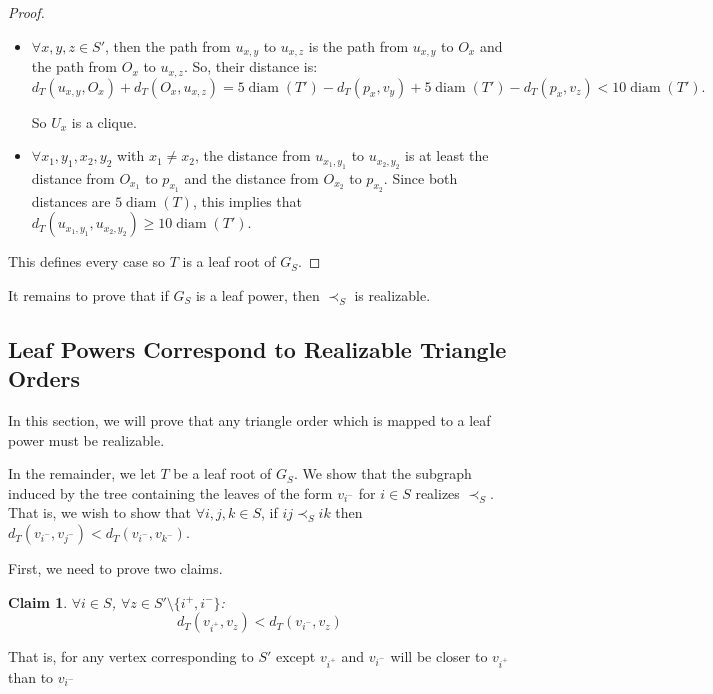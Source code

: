 \documentclass[11pt, letter]{article}
\newtheorem{claim}[theorem]{Claim}
\theoremstyle{remark}
\DeclareMathOperator{\diam}{diam}
\begin{document}
\begin{proof}
\begin{itemize}
        
        \item $\forall x,y,z\in S'$, then the path from $u_{x,y}$ to $u_{x,z}$ is the path from $u_{x,y}$ to $O_x$ and the path from $O_x$ to $u_{x,z}$. So, their distance is: $$d_T(u_{x,y},O_x)+d_T(O_x,u_{x,z})=5\diam(T')-d_T(p_x,v_y)+5\diam(T')-d_T(p_x,v_z)<10\diam(T').$$
        
        So $U_x$ is a clique.
        \item $\forall x_1,y_1,x_2,y_2$ with $x_1\neq x_2$, the distance from $u_{x_1,y_1}$ to $u_{x_2,y_2}$ is at least the distance from $O_{x_1}$ to $p_{x_1}$ and the distance from $O_{x_2}$ to $p_{x_2}$. Since both distances are $5\diam(T)$, this implies that $d_T(u_{x_1,y_1},u_{x_2,y_2})\geq 10\diam(T')$.
    \end{itemize}
    This defines every case so $T$ is a leaf root of $G_S$.
\end{proof}

It remains to prove that if $G_S$ is a leaf power, then $\prec_S$ is realizable. 


\subsection{Leaf Powers Correspond to Realizable Triangle Orders}\label{sec:LP-to-TOC}

In this section, we will prove that any triangle order which is mapped to a leaf power must be realizable.

In the remainder, we let $T$ be a leaf root of $G_S$.
We show that the subgraph induced by the tree containing the leaves of the form $v_{i^-}$ for $i\in S$ realizes $\prec_S$. That is, we wish to show that $\forall i,j,k\in S$, if $ij\prec_S ik$ then $d_T(v_{i^-},v_{j^-})<d_T(v_{i^-},v_{k^-})$.

First, we need to prove two claims. 

\begin{claim}
    \label{claim 1}
    $\forall i\in S$, $\forall z\in S' \setminus \{i^+, i^-\}$:
    $$d_T(v_{i^+}, v_z)<d_T(v_{i^-}, v_z)$$
\end{claim}

That is, for any vertex corresponding to $S'$ except $v_{i^+}$ and $v_{i^-}$ will be closer to $v_{i^+}$ than to $v_{i^-}$
\end{document}
